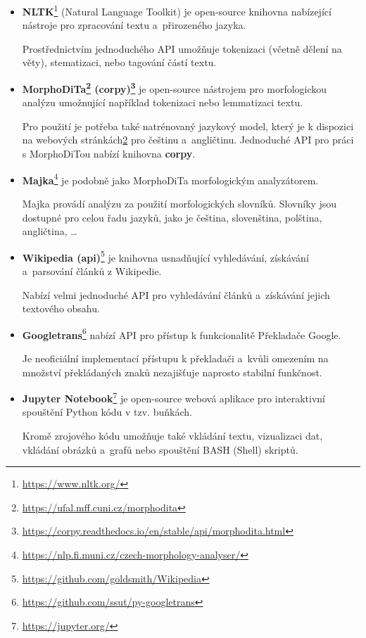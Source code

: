 \begin{itemize}
    \item \textbf{NLTK}\footnote{\url{https://www.nltk.org/}}
    (Natural Language Toolkit) je open-source knihovna nabízející nástroje pro zpracování textu a~přirozeného jazyka.\par Prostřednictvím jednoduchého API umožňuje tokenizaci (včetně dělení na věty), stematizaci, nebo tagování částí textu. 
    
    \item \textbf{MorphoDiTa\footnote{\label{note9}\url{https://ufal.mff.cuni.cz/morphodita}} (corpy)\footnote{\url{https://corpy.readthedocs.io/en/stable/api/morphodita.html}}}
    je open-source nástrojem pro morfologickou analýzu umožnující například tokenizaci nebo lemmatizaci textu.\par
    Pro použití je potřeba také natrénovaný jazykový model, který je k dispozici na webových stránkách\cref{note9} pro češtinu a~angličtinu. Jednoduché API pro práci s MorphoDiTou nabízí knihovna \textbf{corpy}.
    
    \item \textbf{Majka}\footnote{\url{https://nlp.fi.muni.cz/czech-morphology-analyser/}}
    je podobně jako MorphoDiTa morfologickým analyzátorem.\par Majka provádí analýzu za použití morfologických slovníků. Slovníky jsou dostupné pro celou řadu jazyků, jako je čeština, slovenština, polština, angličtina, \dots
    
    \item \textbf{Wikipedia (api)}\footnote{\url{https://github.com/goldsmith/Wikipedia}}
    je knihovna usnadňující vyhledávání, získávání a~parsování článků z Wikipedie. \par Nabízí velmi jednoduché API pro vyhledávání článků a~získávání jejich textového obsahu.
    
    \item \textbf{Googletrans}\footnote{\url{https://github.com/ssut/py-googletrans}}
    nabízí API pro přístup k funkcionalitě Překladače Google. \par
    Je neoficiální implementací přístupu k překladači a~kvůli omezením na množství překládaných znaků nezajišťuje naprosto stabilní funkčnost.
    
    \item \textbf{Jupyter Notebook}\footnote{\url{https://jupyter.org/}} 
    je open-source webová aplikace pro interaktivní spouštění Python kódu v tzv. buňkách.\par
    Kromě zrojového kódu umožňuje také vkládání textu, vizualizaci dat, vkládání obrázků a~grafů nebo spouštění BASH (Shell) skriptů.
    

\end{itemize}
